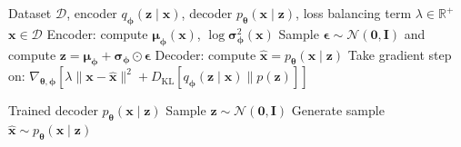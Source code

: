 \documentclass[10pt,twocolumn,article]{memoir}
\begin{document}
\begin{algorithm}[H]
\caption{VAE Training Procedure}
\begin{algorithmic}[0]
\REQUIRE Dataset $\mathcal{D}$, encoder $q_{\boldsymbol{\phi}}(\mathbf{z} \mid \mathbf{x})$, decoder $p_{\boldsymbol{\theta}}(\mathbf{x} \mid \mathbf{z})$, loss balancing term $\lambda \in \mathbb{R}^{+}$
\REPEAT
    \STATE $\mathbf{x} \in \mathcal{D}$
    \STATE Encoder: compute $\boldsymbol{\mu}_{\boldsymbol{\phi}}(\mathbf{x})$, $\log \boldsymbol{\sigma}^2_{\boldsymbol{\phi}}(\mathbf{x})$
    \STATE Sample $\boldsymbol{\epsilon} \sim \mathcal{N}(\mathbf{0}, \mathbf{I})$ and compute $\mathbf{z} = \boldsymbol{\mu}_{\boldsymbol{\phi}} + \boldsymbol{\sigma}_{\boldsymbol{\phi}} \odot \boldsymbol{\epsilon}$
    \STATE Decoder: compute $\hat{\mathbf{x}} = p_{\boldsymbol{\theta}}(\mathbf{x} \mid \mathbf{z})$
    \STATE Take gradient step on:
    \STATE \quad $\nabla_{\boldsymbol{\theta}, \boldsymbol{\phi}} \left[ \lambda \|\mathbf{x} - \hat{\mathbf{x}}\|^2 + D_{\mathrm{KL}} \left[ q_{\boldsymbol{\phi}}(\mathbf{z} \mid \mathbf{x}) \| p(\mathbf{z}) \right] \right]$
\end{algorithmic}
\end{algorithm}

\begin{algorithm}[H]
\caption{VAE Generation Procedure}
\begin{algorithmic}[0]
\REQUIRE Trained decoder $p_{\boldsymbol{\theta}}(\mathbf{x} \mid \mathbf{z})$
\STATE Sample $\mathbf{z} \sim \mathcal{N}(\mathbf{0}, \mathbf{I})$
\STATE Generate sample $\hat{\mathbf{x}} \sim p_{\boldsymbol{\theta}}(\mathbf{x} \mid \mathbf{z})$
\end{algorithmic}
\end{algorithm}

\printbibliography
\end{document}
